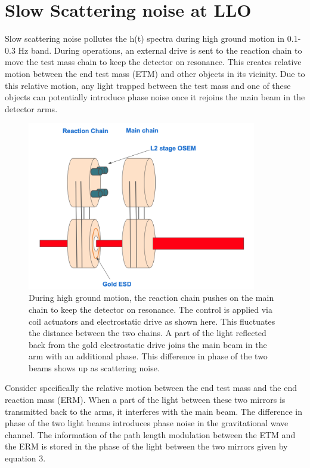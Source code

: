 \documentclass[12pt]{iopart}
\begin{document}
\section{Slow Scattering noise at LLO}\label{m0r0_scattering}
Slow scattering noise pollutes the h(t) spectra during high ground motion in $0.1$-$0.3$ Hz band. During operations, an external drive is sent to the reaction chain to move the test mass chain to keep the detector on resonance. This creates relative motion between the end test mass (ETM) and other objects in its vicinity. 
Due to this relative motion, any light trapped between the test mass and one of these objects can potentially introduce phase noise once it rejoins the main beam in the detector arms. 

\begin{figure}[h]
    \centering
    \includegraphics[width=10cm]{mirror-diag1.png}
    \caption{During high ground motion, the reaction chain pushes on the main chain  to keep the detector on resonance. The control is applied via coil actuators and electrostatic drive as shown here. This fluctuates the distance between the two chains. A part of the light reflected back from the gold electrostatic drive joins the main beam in the arm with an additional phase. This difference in phase of the two beams shows up as scattering noise.}
    \label{fig:mirror_diag}
\end{figure}

Consider specifically the relative motion between the end test mass and the end reaction mass (ERM).
When a part of the light between these two mirrors is transmitted back to the arms, it interferes with the main beam. The difference in phase of the two light beams introduces phase noise in the gravitational wave channel. The information of the path length modulation between the ETM and the ERM is stored in the phase of the light between the two mirrors given by equation 3.
\end{document}
